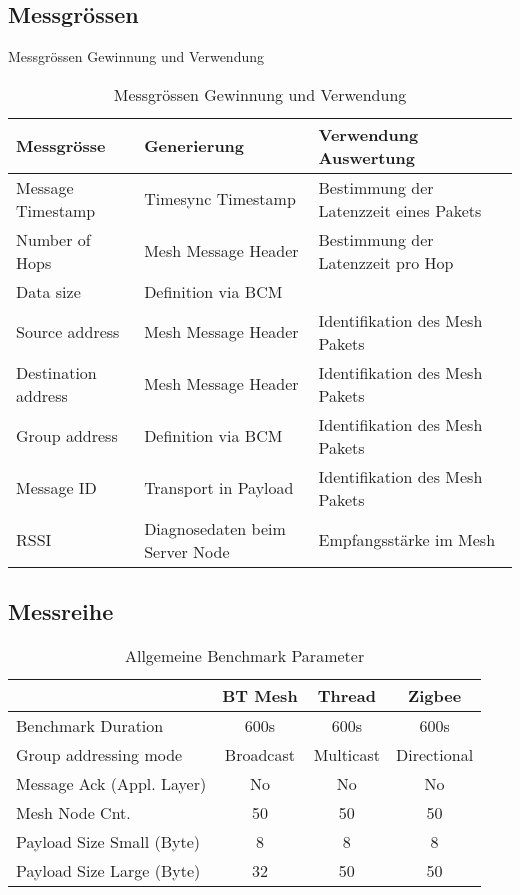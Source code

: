\subsection{Messgrössen}\label{subsec:MessgrössenMesh}

\begin{table}[h]
\centering
\caption{Messgrössen Gewinnung und Verwendung}
\label{tab:MessgrössenGewinnungundVerwendung}
\begin{tabular}{lll} 
\toprule
Messgrösse & Generierung & Verwendung Auswertung \\ 
\hline
Message Timestamp & Timesync Timestamp & Bestimmung der Latenzzeit eines Pakets \\
Number of Hops & Mesh Message Header & Bestimmung der Latenzzeit pro Hop \\
Data size & Definition via BCM &  \\
Source address & Mesh Message Header & Identifikation des Mesh Pakets \\
Destination address & Mesh Message Header & Identifikation des Mesh Pakets \\
Group address & Definition via BCM & Identifikation des Mesh Pakets \\
Message ID & Transport in Payload & Identifikation des Mesh Pakets \\
RSSI & Diagnosedaten beim Server Node & Empfangsstärke im Mesh \\
\bottomrule
\end{tabular}
\caption{Messgrössen Gewinnung und Verwendung}
\label{tab:MessgrössenGewinnungundVerwendung}
\end{table}

\subsection{Messreihe}\label{subsec:Messreihe}


\begin{table}[h]
\centering
\begin{tabular}{lccc} 
\toprule
 & BT Mesh & Thread & Zigbee \\ 
\hline
Benchmark Duration & 600s & 600s & 600s \\
Group addressing mode & Broadcast & Multicast & Directional \\
Message Ack (Appl. Layer) & No & No & No \\
Mesh Node Cnt. & 50 & 50 & 50 \\
Payload Size Small (Byte) & 8 & 8 & 8 \\
Payload Size Large (Byte) & 32 & 50 & 50 \\
\bottomrule
\end{tabular}
\caption{Allgemeine Benchmark Parameter}
\label{tab:AllgemeineBenchmarkParameter}
\end{table}


